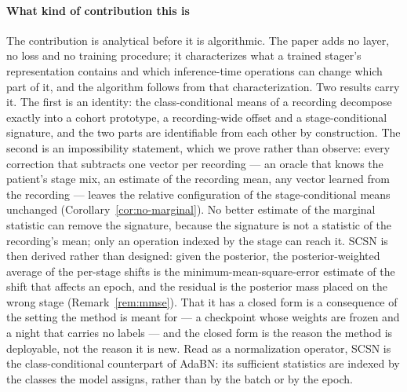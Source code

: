 \paragraph{What kind of contribution this is}
The contribution is analytical before it is algorithmic. The paper adds no
layer, no loss and no training procedure; it characterizes what a trained
stager's representation contains and which inference-time operations can change
which part of it, and the algorithm follows from that characterization. Two
results carry it. The first is an identity: the class-conditional means of a
recording decompose exactly into a cohort prototype, a recording-wide offset
and a stage-conditional signature, and the two parts are identifiable from each
other by construction. The second is an impossibility statement, which we
prove rather than observe: every correction that subtracts one vector per
recording --- an oracle that knows the patient's stage mix, an estimate of the
recording mean, any vector learned from the recording --- leaves the relative
configuration of the stage-conditional means unchanged
(Corollary~\ref{cor:no-marginal}). No better estimate of the marginal statistic
can remove the signature, because the signature is not a statistic of the
recording's mean; only an operation indexed by the stage can reach it. SCSN is
then derived rather than designed: given the posterior, the posterior-weighted
average of the per-stage shifts is the minimum-mean-square-error estimate of
the shift that affects an epoch, and the residual is the posterior mass placed
on the wrong stage (Remark~\ref{rem:mmse}). That it has a closed form is a
consequence of the setting the method is meant for --- a checkpoint whose
weights are frozen and a night that carries no labels --- and the closed form
is the reason the method is deployable, not the reason it is new. Read as a
normalization operator, SCSN is the class-conditional counterpart of AdaBN: its
sufficient statistics are indexed by the classes the model assigns, rather than
by the batch or by the epoch.

